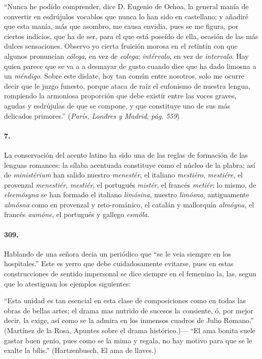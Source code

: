 \documentclass{book}
\begin{document}
``Nunca he podido comprender, dice D. Eugenio de Ochoa, la general manía de convertir en esdrújulos 
vocablos que nunca lo han sido en castellano; y añadiré que esta manía, más que asombro, me causa 
envidia, pues se me figura, por ciertos indicios, que ha de ser, para el que está poseído de ella, 
ocasión de las más dulces sensaciones. Observo yo cierta fruición morosa en el retintín con que algunos 
pronuncian \emph{cólega}, en vez de \emph{colega}; \emph{intérvalo}, en vez de \emph{intervalo}. Hay 
quien parece que se va a a desmayar de gusto cuando dice que ha dado limosna a un \emph{méndigo}. Sobre 
este dislate, hoy tan común entre nosotros, solo me ocurre decir que le juzgo funesto, porque ataca de 
raíz el eufonismo de nuestra lengua, rompiendo la armoniosa proporción que debe existir entre las voces 
graves, agudas y esdrújulas de que se compone, y que constituye uno de sus más delicados primores.'' 
(\emph{París, Londres y Madrid}, \emph{pág. 559})

\paragraph{7.} La conservación del acento latino ha sido una de las reglas de formación de las lenguas 
romances: la sílaba acentuada constituye como el núcleo de la plabra: así de \emph{ministérium} han 
salido nuestro \emph{menestér}, el italiano \emph{mestiéro}, \emph{mestiére}, el provenzal 
\emph{menestiér}, \emph{mestiér}, el portugués \emph{mistér}, el francés \emph{metiér}; lo mismo, de
\emph{eleemósyna} se han formado el italiano \emph{limósina}, nuestro \emph{limósna}, antiguamente 
\emph{almósna} como en provenzal y reto-románico, el catalán y mallorquín \emph{almóyna}, el francés
\emph{aumône}, el portugués y gallego \emph{esmóla}.

\paragraph{309.} Hablando de una señora decia un periódico que “se le veia siempre en los hospitales.” Este es yerro que debe cuidadosamente evitarse, pues en estas construcciones de sentido impersonal se dice siempre en el femenino la, las, segun que lo atestiguan los ejemplos siguientes:

``Esta unidad es tan esencial en esta clase de composiciones como en todas las obras de bellas artes; el drama mas nutrido de sucesos la consiente, ó, por mejor decir, la exige, así como se la admira en los inmensos cuadros de Julio Romano.'' (Martínez de la Rosa, Apuntes sobre el drama histórico.)--- ``El  ama bonita suele gastar buen genio, pues como se la mima y regala, no hay motivo para que se le exalte la bílis.'' (Hartzenbusch, El ama de llaves.)
\end{document}
